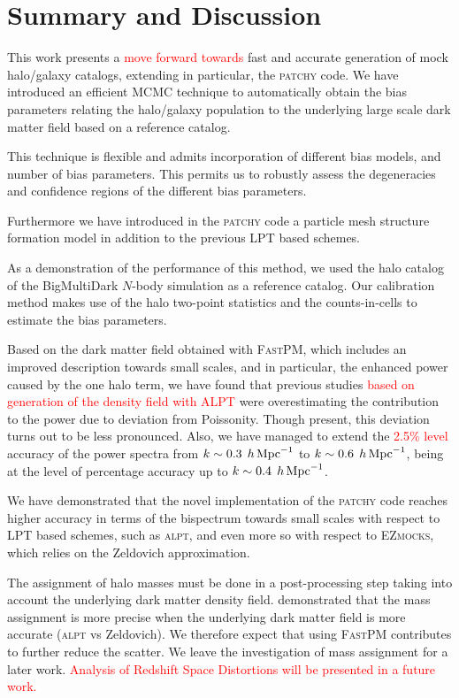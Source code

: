 \documentclass[english,usenatbib]{mn2e}
\newcommand{\tod}[1]{{\textcolor{red}{ #1}}}
\newcommand{\hperm}{\,h\,{\rm Mpc}^{-1}}
\begin{document}
\section{Summary and Discussion}
\label{sec:discussion}


This work presents a \tod{move forward towards} fast and accurate generation of mock halo/galaxy catalogs, extending in particular, the \textsc{patchy} code. We have introduced an efficient MCMC technique to automatically obtain the bias parameters relating the halo/galaxy population to the underlying large scale dark matter field based on a reference catalog. 

This technique is flexible and admits incorporation of different bias models, and number of bias parameters. This permits us to robustly assess the degeneracies and confidence regions of the different bias parameters.

Furthermore we have introduced in the \textsc{patchy} code a particle mesh structure formation model \citep[the \textsc{FastPM} code, see][]{fastpm} in addition to the previous LPT based schemes.


As a demonstration of the performance of this method, we used the halo catalog of the BigMultiDark $N$-body simulation as a reference catalog. Our calibration method makes use of the halo two-point statistics and the counts-in-cells to estimate the bias parameters. 

Based on the dark matter field obtained with \textsc{FastPM}, which includes an improved description towards small scales, and in particular, the enhanced power caused by the one halo term, we have found that previous studies \tod{based on generation of the density field with \textsc{ALPT}} were overestimating the contribution to the power due to deviation from Poissonity. Though present, this deviation turns out to be less pronounced. Also, we have managed to extend the \tod{2.5\% level} accuracy of the power spectra from $k\sim 0.3\; \hperm$ to $k\sim 0.6 \;\hperm$, being at the level of percentage accuracy up to $k\sim 0.4\; \hperm$.

We have demonstrated that the novel implementation of the \textsc{patchy} code reaches higher accuracy in terms of the bispectrum towards small scales with respect to LPT based schemes, such as \textsc{alpt}, and even more so with respect to \textsc{EZmocks}, which relies on the Zeldovich approximation. 

The assignment of halo masses must be done in a post-processing step taking into account the underlying dark matter density field. \citet{zhao2015} demonstrated that the mass assignment is more precise when the underlying dark matter field is more accurate (\textsc{alpt} vs Zeldovich). We therefore expect that using \textsc{FastPM} contributes to further reduce the scatter. We leave the investigation of mass assignment for a later work. \tod{Analysis of Redshift Space Distortions will be presented in a future work.}
\end{document}
